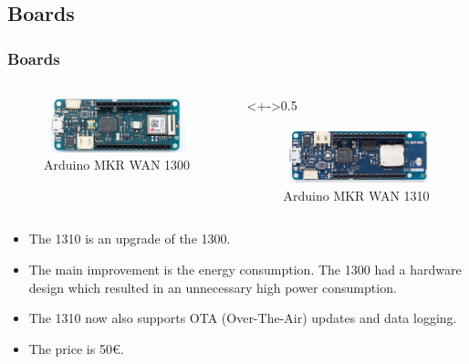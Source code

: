 \documentclass{beamer}
\begin{document}
\subsection{Boards}
\begin{frame}
    \frametitle{Boards}
    \begin{columns}[]
        \begin{column}{0.5\textwidth}
            \begin{figure}
                \includegraphics[width=\textwidth]{images/mkr1300.jpg}
                \caption{Arduino MKR WAN 1300}
            \end{figure}
        \end{column}
        \begin{column}<+->{0.5\textwidth}
            \begin{figure}
                \includegraphics[width=\textwidth]{images/mkr1310.png}
                \caption{Arduino MKR WAN 1310}
            \end{figure}
        \end{column}
    \end{columns}

    \vspace{0.5cm}

    \begin{itemize}[<+->]
        \item The 1310 is an upgrade of the 1300.
        \item The main improvement is the energy consumption. The 1300 had a hardware design
              which resulted in an unnecessary high power consumption.
        \item The 1310 now also supports OTA (Over-The-Air) updates and data logging.
        \item The price is 50\euro.
    \end{itemize}
\end{frame}
\end{document}
